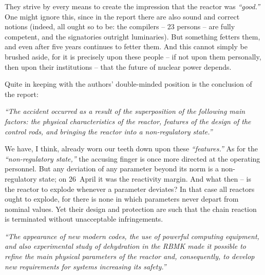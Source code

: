 \documentclass[openright]{bookest}
\begin{document}
They strive by every means to create the impression that the reactor was \textit{``good.''} One might ignore this, since in the report there are also sound and correct notions (indeed, all ought so to be: the compilers -- \num{23} persons -- are fully competent, and the signatories outright luminaries). But something fetters them, and even after five years continues to fetter them. And this cannot simply be brushed aside, for it is precisely upon these people -- if not upon them personally, then upon their institutions -- that the future of nuclear power depends.

Quite in keeping with the authors' double-minded position is the conclusion of the report:

\begin{personal}
\textit{``The accident occurred as a result of the superposition of the following main factors: the physical characteristics of the reactor, features of the design of the control rods, and bringing the reactor into a non-regulatory state.''}
\end{personal}

We have, I think, already worn our teeth down upon these \textit{``features.''} As for the \textit{``non-regulatory state,''} the accusing finger is once more directed at the operating personnel. But any deviation of any parameter beyond its norm is a non-regulatory state; on 26~April it was the reactivity margin. And what then -- is the reactor to explode whenever a parameter deviates? In that case all reactors ought to explode, for there is none in which parameters never depart from nominal values. Yet their design and protection are such that the chain reaction is terminated without unacceptable infringements.

\begin{personal}
\textit{``The appearance of new modern codes, the use of powerful computing equipment, and also experimental study of dehydration in the RBMK made it possible to refine the main physical parameters of the reactor and, consequently, to develop new requirements for systems increasing its safety.''}
\end{personal}
\end{document}
